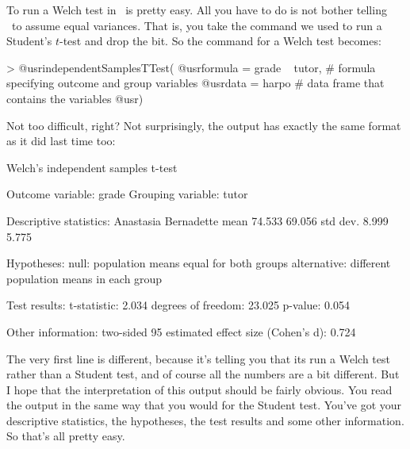 
To run a Welch test in \R\ is pretty easy. All you have to do is not bother telling \R\ to assume equal variances. That is, you take the command we used to run a Student's $t$-test and drop the  bit. So the command for a Welch test becomes:
\begin{rblock1}
> @usr{independentSamplesTTest(} 
      @usr{formula = grade ~ tutor,}  # formula specifying outcome and group variables
      @usr{data = harpo}              # data frame that contains the variables
  @usr{)}
\end{rblock1}
Not too difficult, right? Not surprisingly, the output has exactly the same format as it did last time too:
\begin{rblock1}
   Welch's independent samples t-test 

Outcome variable:   grade 
Grouping variable:  tutor 

Descriptive statistics: 
            Anastasia Bernadette
   mean        74.533     69.056
   std dev.     8.999      5.775

Hypotheses: 
   null:        population means equal for both groups
   alternative: different population means in each group

Test results: 
   t-statistic:  2.034 
   degrees of freedom:  23.025 
   p-value:  0.054 

Other information: 
   two-sided 95%
   estimated effect size (Cohen's d):  0.724 
\end{rblock1}
The very first line is different, because it's telling you that its run a Welch test rather than a Student test, and of course all the numbers are a bit different. But I hope that the interpretation of this output should be fairly obvious. You read the output in the same way that you would for the Student test. You've got your descriptive statistics, the hypotheses, the test results and some other information. So that's all pretty easy. 

